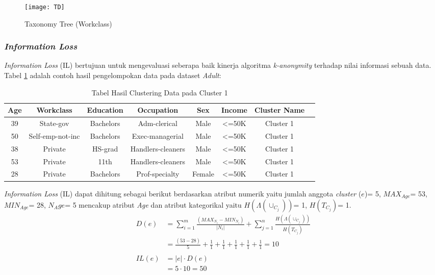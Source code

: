 \begin{figure}[H]
	\centering
	\texttt{[image: TD]}
	\caption{Taxonomy Tree (Workclass)}
	\label{fig:TD}
\end{figure}

\subsubsection{\textit{Information Loss}}
\textit{Information Loss} (IL) bertujuan untuk mengevaluasi seberapa baik kinerja algoritma \textit{k-anonymity} terhadap nilai informasi sebuah data. Tabel  \ref{table:informationloss} adalah contoh hasil pengelompokan data pada dataset \textit{Adult}:

\begin{table}[H]
\centering
\caption{Tabel Hasil Clustering Data pada Cluster 1}
\begin{tabular}{c c c c c c c c}
\hline 
Age & Workclass & Education & Occupation & Sex & Income & Cluster Name \\ 
\hline 
39 & State-gov & Bachelors & Adm-clerical & Male & <=50K & Cluster 1 \\ 
50 & Self-emp-not-inc & Bachelors & Exec-managerial & Male & <=50K & Cluster 1 \\ 
38 & Private & HS-grad & Handlers-cleaners & Male & <=50K & Cluster 1 \\ 
53 & Private & 11th & Handlers-cleaners & Male & <=50K & Cluster 1 \\ 
28 & Private & Bachelors & Prof-specialty & Female & <=50K & Cluster 1 \\ 
\hline 
\end{tabular} 
\label{table:informationloss}
\end{table}

\noindent \textit{Information Loss} (IL) dapat dihitung sebagai berikut berdasarkan atribut numerik yaitu jumlah anggota \textit{cluster} ($e$)= 5, $MAX_{Age}$= 53, $MIN_{Age}$= 28, $N_Age$= 5 mencakup atribut \textit{Age} dan atribut kategorikal yaitu $H(\Lambda(\cup_{C_j}))$= 1, $H(T_{C_j})$= 1.
\begin{align*}
D(e) &= \sum_{i=1}^{m} \frac{(MAX_{N_i} - MIN_{N_i})}{|N_i|} + \sum_{j=1}^{n}\frac{H(\Lambda(\cup_{C_j}))}{H(T_{C_j})}\\
&= \frac{(53 - 28)}{5} + \frac{1}{1}+\frac{1}{1}+\frac{1}{1}+\frac{1}{1}+\frac{1}{1} = 10\\\\
IL(e) &= |e| \cdot D(e)\\
&= 5 \cdot 10 = 50
\end{align*}

